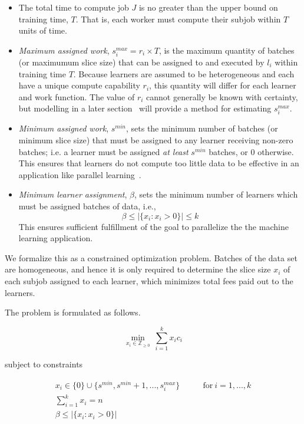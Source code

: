 \documentclass[../mthe-493-final-project.tex]{subfiles}
\begin{document}
    \begin{itemize}
        \item The total time to compute job $J$ is no greater than the upper bound on training time, $T$. That is, each worker must compute their subjob within $T$ units of time.
        \item \textit{Maximum assigned work}, $s^{max}_i = r_i \times T$, is the maximum quantity of batches (or maximumum slice size) that can be assigned to and executed by $l_i$ within training time $T$. Because learners are assumed to be heterogeneous and each have a unique compute capability $r_i$, this quantity will differ for each learner and work function. The value of $r_i$ cannot generally be known with certainty, but modelling in a later section~ will provide a method for estimating $s_i^{max}$.
        \item \textit{Minimum assigned work}, $s^{min}$, sets the minimum number of batches (or minimum slice size) that must be assigned to any learner receiving non-zero batches; i.e. a learner must be assigned \textit{at least} $s^{min}$ batches, or 0 otherwise. This ensures that learners do not compute too little data to be effective in an application like parallel learning~.
        \item \textit{Minimum learner assignment}, $\beta$, sets the minimum number of learners which must be assigned batches of data, i.e.,
              \[\beta \leq \vert \{x_i : x_i > 0\} \vert \leq k\]
        This ensures sufficient fulfillment of the goal to parallelize the the machine learning application.
    \end{itemize}

    We formalize this as a constrained optimization problem. Batches of the data set are homogeneous, and hence it is only required to determine the slice size $x_i$ of each subjob assigned to each learner, which minimizes total fees paid out to the learners.
    
    The problem is formulated as follows.

    \begin{equation}
        \label{eq:optimization-objective-function}
        \min_{x_i \in \mathbb{Z}_{\geq 0}} \ \sum_{i=1}^k x_i c_i
    \end{equation}

    subject to constraints

    \begin{align}
        x_i \in \{0\} \cup \{s^{min}, s^{min} + 1,...,s^{max}_i\} &\qquad \text{for} \ i=1,...,k \label{eq:optimization-constraint-1} \\
        \sum_{i = 1}^k x_i = n \label{eq:optimization-constraint-2} \\
        \beta \leq \vert \{x_i : x_i > 0\} \vert \label{eq:optimization-constraint-3}
    \end{align}
    
\end{document}
